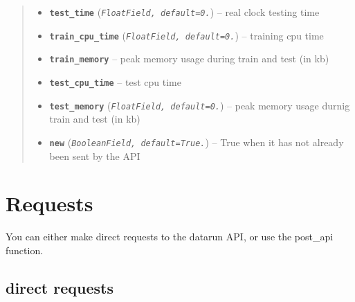 \documentclass[letterpaper,10pt,english]{sphinxmanual}
\begin{document}
\begin{fulllineitems}
\begin{quote}
\begin{description}
\begin{itemize}
\item {} 
\textbf{\texttt{test\_time}} (\emph{\texttt{FloatField, default=0.}}) -- real clock testing time

\item {} 
\textbf{\texttt{train\_cpu\_time}} (\emph{\texttt{FloatField, default=0.}}) -- training cpu time

\item {} 
\textbf{\texttt{train\_memory}} -- peak memory usage during train and test (in kb)

\item {} 
\textbf{\texttt{test\_cpu\_time}} -- test cpu time

\item {} 
\textbf{\texttt{test\_memory}} (\emph{\texttt{FloatField, default=0.}}) -- peak memory usage durnig train and test (in kb)

\item {} 
\textbf{\texttt{new}} (\emph{\texttt{BooleanField, default=True.}}) -- True when it has not already been sent by the API

\end{itemize}

\end{description}\end{quote}

\end{fulllineitems}



\chapter{Requests}
\label{modules/views:requests}\label{modules/views::doc}
You can either make direct requests to the datarun API, or use the post\_api function.


\section{direct requests}
\label{modules/views:direct-requests}\label{modules/views:module-runapp.views}\label{modules/views:requestsdirect}
\end{document}
